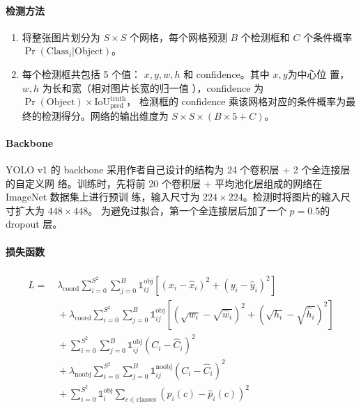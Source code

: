 \paragraph{检测方法}

\begin{enumerate}
  \item 将整张图片划分为 $S \times S$ 个网格，每个网格预测 $ B $ 个检测框和 $ C $
    个条件概率 $ \Pr(\mathrm{Class}_i|\mathrm{Object}) $。
  \item 每个检测框共包括 5 个值： $x, y, w, h$ 和 confidence。其中 $x, y$为中心位
    置，$w, h$ 为长和宽（相对图片长宽的归一值
    ），confidence 为$\Pr(\mathrm{Object}) \times
    \mathrm{IoU}^{\mathrm{truth}}_{\mathrm{pred}}$，
    检测框的 confidence 乘该网格对应的条件概率为最终的检测得分。网络的输出维度为 $ S
    \times S \times (B \times 5 + C) $。
\end{enumerate}

\paragraph{Backbone}

YOLO v1 的 backbone 采用作者自己设计的结构为 24 个卷积层 + 2 个全连接层的自定义网
络。训练时，先将前 20 个卷积层 + 平均池化层组成的网络在 ImageNet 数据集上进行预训
练，输入尺寸为 $224 \times 224$。检测时将图片的输入尺寸扩大为 $448 \times 448$。
为避免过拟合，第一个全连接层后加了一个 $p=0.5$的 dropout 层。

\paragraph{损失函数}

\begin{align}
  \label{equ:yolo-v1-loss}
  \begin{split}
    L = & \, \lambda_{\mathrm{coord}} \sum_{i=0}^{S^2} \sum_{j=0}^{B} \mathds{1}_{ij}^{\mathrm{obj}} \left [ {\left (x_i - \hat{x}_i \right )}^2 + {\left (y_i - \hat{y}_i \right )}^2 \right ] \\
    & \, + \lambda_{\mathrm{coord}} \sum_{i=0}^{S^2} \sum_{j=0}^{B} \mathds{1}_{ij}^{\mathrm{obj}} \left [ {\left(\sqrt{w_i} - \sqrt{\hat{w}_i} \right)}^2 + {\left (\sqrt{h_i} - \sqrt{\hat{h}_i} \right )}^2 \right ]  \\
    & \, + \sum_{i=0}^{S^2} \sum_{j=0}^{B} \mathds{1}_{ij}^{\mathrm{obj}} {\left( C_i - \hat{C}_i \right)}^2  \\
    & \, + \lambda_{\mathrm{noobj}} \sum_{i=0}^{S^2} \sum_{j=0}^{B} \mathds{1}_{ij}^{\mathrm{noobj}} {\left( C_i - \hat{C}_i \right)}^2  \\
    & \, + \sum_{i=0}^{S^2} \mathds{1}_{i}^{\mathrm{obj}} \sum_{c \in \mathrm{classes}} {\left( p_i(c) - \hat{p}_i(c) \right)}^2
  \end{split}
\end{align}

